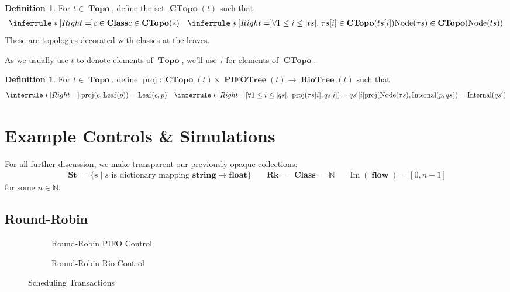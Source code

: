 \documentclass{amsart}
\DeclareMathOperator{\Ima}{Im}
\newcommand{\inference}[3]{\inferrule*[Right=#1]{#2}{#3}}
\newcommand{\axiom}[2]{\inferrule*[Right=#1]{\;}{#2}}
\DeclareMathOperator{\proj}{\mathrm{proj}}
\DeclareMathOperator{\Rk}{\mathbf{Rk}}
\DeclareMathOperator{\Topo}{\mathbf{Topo}}
\DeclareMathOperator{\PIFOTree}{\mathbf{PIFOTree}}
\DeclareMathOperator{\Leaf}{\mathrm{Leaf}}
\DeclareMathOperator{\Internal}{\mathrm{Internal}}
\DeclareMathOperator{\Node}{\mathrm{Node}}
\DeclareMathOperator{\St}{\mathbf{St}}
\DeclareMathOperator{\Class}{\mathbf{Class}}
\DeclareMathOperator{\flow}{\mathbf{flow}}
\DeclareMathOperator{\CTopo}{\textbf{CTopo}}
\DeclareMathOperator{\RioTree}{\mathbf{RioTree}}
\theoremstyle{definition}
\newtheorem{dfn}[thm]{Definition}
\begin{document}
\begin{dfn}
    For $t \in \Topo$, define the set $\CTopo(t)$ such that
    \begin{align*}
        \inference{}
        {c \in \Class}
        {c \in \CTopo(\ast)}
        &&
        \inference{}
        {\forall 1 \leq i \leq |ts|. \; \tau s[i] \in \CTopo(ts[i])}
        {\Node(\tau s) \in \CTopo(\Node(ts))}
    \end{align*}
    These are topologies decorated with classes at the leaves.
\end{dfn}

As we usually use $t$ to denote elements of $\Topo$, we'll use $\tau$ for elements of $\CTopo$.

\begin{dfn}
    For $t \in \Topo$, define $\proj: \CTopo(t) \times \PIFOTree(t) \to \RioTree(t)$ such that
    \begin{align*}
        \axiom{}
        {\proj(c, \Leaf(p)) = \Leaf(c, p)}
        &&
        \inference{}
        {\forall 1 \leq i \leq |qs|. \; \proj(\tau s[i], qs[i]) = qs^\prime[i]}
        {\proj(\Node(\tau s), \Internal(p, qs)) = \Internal(qs^\prime)}
    \end{align*}
\end{dfn}

\newpage

\section{Example Controls \& Simulations}

For all further discussion, we make transparent our previously opaque collections:
\begin{align*}
    \St = \{s \mid s \text{ is dictionary mapping } \textbf{string} \to \textbf{float}\} &&
    \Rk = \Class = \mathbb N &&
    \Ima(\flow) = [0, n - 1]
\end{align*}
for some $n \in \mathbb N$.

\subsection{Round-Robin}

\begin{figure}[!htb]
    \centering
    \begin{subfigure}[t]{0.49\linewidth}
        
        
        \caption{Round-Robin PIFO Control}
        \label{fig:rr-pifo-ctrl}
    \end{subfigure}
    \begin{subfigure}[t]{0.49\linewidth}
        
        
        
        \caption{Round-Robin Rio Control}
        \label{fig:rr-rio-ctrl}
    \end{subfigure}
    \caption{Scheduling Transactions}
    \label{fig:sched_trans}
\end{figure}
\end{document}
